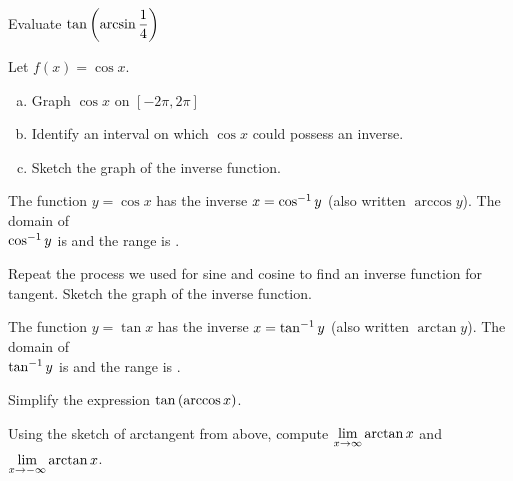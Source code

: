 \documentclass[notes]{subfiles}
\begin{document}
		\begin{ex}
			Evaluate \(\tan\left( \arcsin \dfrac{1}{4}\right)\)
		\end{ex}
		
		\begin{ex}
			Let \(f(x) = \cos x\).
			\begin{enumerate}[(a)]
				\item Graph \(\cos x\) on \([-2\pi, 2\pi]\)
					
				\item Identify an interval on which \(\cos x\) could possess an inverse.
					
				\item Sketch the graph of the inverse function.
					
			\end{enumerate}
		\end{ex}	
		\newpage
		
		\begin{rmk}
			The function \(y = \cos x\) has the inverse \(x = \cos^{-1}y\) (also written \(\arccos y\)).  The domain of \\[20pt] \(\cos^{-1} y\) is  and the range is \blank{2.5}.
		\end{rmk}
		
		\begin{ex}
			Repeat the process we used for sine and cosine to find an inverse function for tangent.  Sketch the graph of the inverse function.
		\end{ex}
			\vs{1}
			
		\begin{rmk}
			The function \(y = \tan x\) has the inverse \(x = \tan^{-1}y\) (also written \(\arctan y\)).  The domain of \\[20pt] \(\tan^{-1}y\) is  and the range is \blank{2.5}.  
		\end{rmk}
		
		\begin{ex}
			Simplify the expression \(\tan\left( \arccos x\right)\).
		\end{ex}
			\vs{.5}
			
		\begin{ex}
			Using the sketch of arctangent from above, compute \(\displaystyle\lim_{x\to \infty} \arctan x\) and \(\displaystyle\lim_{x\to -\infty} \arctan x\).
		\end{ex}
			\vs{.5}
			\newpage
			
\end{document}
